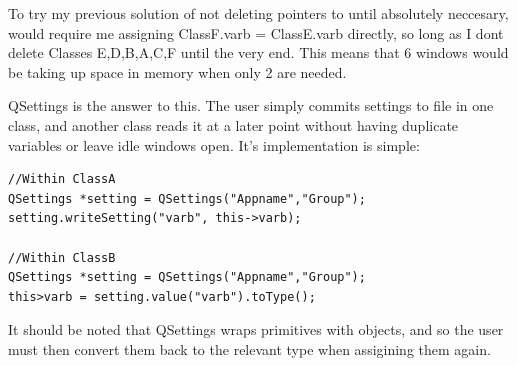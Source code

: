 To try my previous solution of not deleting pointers to until absolutely neccesary, would require me assigning ClassF.varb =  ClassE.varb directly, so long as I dont delete Classes E,D,B,A,C,F until the very end. This means that 6 windows would be taking up space in memory when only 2 are needed.

QSettings is the answer to this. The user simply commits settings to file in one class, and another class reads it at a later point without having duplicate variables or leave idle windows open.
It's implementation is simple:
\begin{lstlisting}
//Within ClassA
QSettings *setting = QSettings("Appname","Group");
setting.writeSetting("varb", this->varb);

//Within ClassB
QSettings *setting = QSettings("Appname","Group");
this>varb = setting.value("varb").toType();
\end{lstlisting}
It should be noted that QSettings wraps primitives with objects, and so the user must then convert them back to the relevant type when assigining them again.

%
%